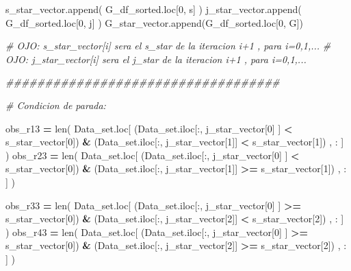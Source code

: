 \documentclass[
  11pt,
  a4paper,
]{article}
\newenvironment{Shaded}{\begin{snugshade}}{\end{snugshade}}
\newcommand{\BuiltInTok}[1]{#1}
\newcommand{\CommentTok}[1]{\textcolor[rgb]{0.56,0.35,0.01}{\textit{#1}}}
\newcommand{\DecValTok}[1]{\textcolor[rgb]{0.00,0.00,0.81}{#1}}
\newcommand{\NormalTok}[1]{#1}
\newcommand{\OperatorTok}[1]{\textcolor[rgb]{0.81,0.36,0.00}{\textbf{#1}}}
\newcommand{\StringTok}[1]{\textcolor[rgb]{0.31,0.60,0.02}{#1}}
\begin{document}
\begin{Shaded}
\begin{Highlighting}[]
\NormalTok{        s\_star\_vector.append( G\_df\_sorted.loc[}\DecValTok{0}\NormalTok{, }\StringTok{\textquotesingle{}s\textquotesingle{}}\NormalTok{] )}
\NormalTok{        j\_star\_vector.append( G\_df\_sorted.loc[}\DecValTok{0}\NormalTok{, }\StringTok{\textquotesingle{}j\textquotesingle{}}\NormalTok{] )}
\NormalTok{        G\_star\_vector.append(G\_df\_sorted.loc[}\DecValTok{0}\NormalTok{, }\StringTok{\textquotesingle{}G\textquotesingle{}}\NormalTok{])}

        \CommentTok{\# OJO: s\_star\_vector[i] sera el s\_star de la iteracion i+1 , para i=0,1,...}
        \CommentTok{\# OJO: j\_star\_vector[i] sera el j\_star de la iteracion i+1 , para i=0,1,... }


      \CommentTok{\#\#\#\#\#\#\#\#\#\#\#\#\#\#\#\#\#\#\#\#\#\#\#\#\#\#\#\#\#\#\#\#\#\#\#}

        \CommentTok{\# Condicion de parada:}

\NormalTok{        obs\_r13 }\OperatorTok{=} \BuiltInTok{len}\NormalTok{( Data\_set.loc[ (Data\_set.iloc[:, j\_star\_vector[}\DecValTok{0}\NormalTok{] ] }\OperatorTok{\textless{}}\NormalTok{ s\_star\_vector[}\DecValTok{0}\NormalTok{]) }\OperatorTok{\&}\NormalTok{ (Data\_set.iloc[:, j\_star\_vector[}\DecValTok{1}\NormalTok{]] }\OperatorTok{\textless{}}\NormalTok{ s\_star\_vector[}\DecValTok{1}\NormalTok{]) , : ] )}
\NormalTok{        obs\_r23 }\OperatorTok{=} \BuiltInTok{len}\NormalTok{( Data\_set.loc[ (Data\_set.iloc[:, j\_star\_vector[}\DecValTok{0}\NormalTok{] ] }\OperatorTok{\textless{}}\NormalTok{ s\_star\_vector[}\DecValTok{0}\NormalTok{]) }\OperatorTok{\&}\NormalTok{ (Data\_set.iloc[:, j\_star\_vector[}\DecValTok{1}\NormalTok{]] }\OperatorTok{\textgreater{}=}\NormalTok{ s\_star\_vector[}\DecValTok{1}\NormalTok{]) , : ] )}

\NormalTok{        obs\_r33 }\OperatorTok{=} \BuiltInTok{len}\NormalTok{( Data\_set.loc[ (Data\_set.iloc[:, j\_star\_vector[}\DecValTok{0}\NormalTok{] ] }\OperatorTok{\textgreater{}=}\NormalTok{ s\_star\_vector[}\DecValTok{0}\NormalTok{]) }\OperatorTok{\&}\NormalTok{ (Data\_set.iloc[:, j\_star\_vector[}\DecValTok{2}\NormalTok{]] }\OperatorTok{\textless{}}\NormalTok{ s\_star\_vector[}\DecValTok{2}\NormalTok{]) , : ] )}
\NormalTok{        obs\_r43 }\OperatorTok{=} \BuiltInTok{len}\NormalTok{( Data\_set.loc[ (Data\_set.iloc[:, j\_star\_vector[}\DecValTok{0}\NormalTok{] ] }\OperatorTok{\textgreater{}=}\NormalTok{ s\_star\_vector[}\DecValTok{0}\NormalTok{]) }\OperatorTok{\&}\NormalTok{ (Data\_set.iloc[:, j\_star\_vector[}\DecValTok{2}\NormalTok{]] }\OperatorTok{\textgreater{}=}\NormalTok{ s\_star\_vector[}\DecValTok{2}\NormalTok{]) , : ] )}



\end{Highlighting}
\end{Shaded}
\end{document}
